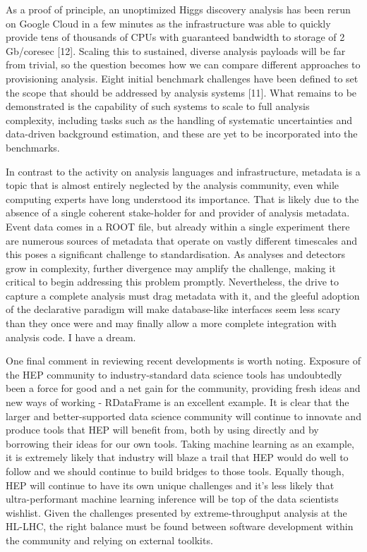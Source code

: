 \documentclass[11pt,a4paper]{article}
\begin{document}
As a proof of principle, an unoptimized Higgs discovery analysis has
been rerun on Google Cloud in a few minutes as the infrastructure was
able to quickly provide tens of thousands of CPUs with guaranteed
bandwidth to storage of 2 Gb/coresec {[}12{]}. Scaling this to
sustained, diverse analysis payloads will be far from trivial, so the
question becomes how we can compare different approaches to provisioning
analysis. Eight initial benchmark challenges have been defined to set
the scope that should be addressed by analysis systems {[}11{]}. What
remains to be demonstrated is the capability of such systems to scale to
full analysis complexity, including tasks such as the handling of
systematic uncertainties and data-driven background estimation, and
these are yet to be incorporated into the benchmarks.

In contrast to the activity on analysis languages and infrastructure,
metadata is a topic that is almost entirely neglected by the analysis
community, even while computing experts have long understood its
importance. That is likely due to the absence of a single coherent
stake-holder for and provider of analysis metadata. Event data comes in
a ROOT file, but already within a single experiment there are numerous
sources of metadata that operate on vastly different timescales and this
poses a significant challenge to standardisation. As analyses and
detectors grow in complexity, further divergence may amplify the
challenge, making it critical to begin addressing this problem promptly.
Nevertheless, the drive to capture a complete analysis must drag
metadata with it, and the gleeful adoption of the declarative paradigm
will make database-like interfaces seem less scary than they once were
and may finally allow a more complete integration with analysis code. I
have a dream.

One final comment in reviewing recent developments is worth noting.
Exposure of the HEP community to industry-standard data science tools
has undoubtedly been a force for good and a net gain for the community,
providing fresh ideas and new ways of working - RDataFrame is an
excellent example. It is clear that the larger and better-supported data
science community will continue to innovate and produce tools that HEP
will benefit from, both by using directly and by borrowing their ideas
for our own tools. Taking machine learning as an example, it is
extremely likely that industry will blaze a trail that HEP would do well
to follow and we should continue to build bridges to those tools.
Equally though, HEP will continue to have its own unique challenges and
it's less likely that ultra-performant machine learning inference will
be top of the data scientists wishlist. Given the challenges presented
by extreme-throughput analysis at the HL-LHC, the right balance must be
found between software development within the community and relying on
external toolkits.
\end{document}
